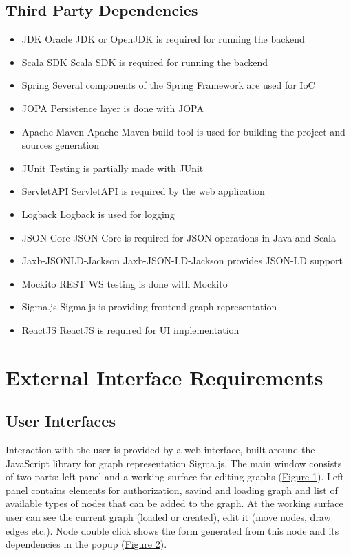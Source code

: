 \documentclass{article}
\begin{document}
\subsection{Third Party Dependencies}
\begin{itemize}
    \item JDK
	Oracle JDK or OpenJDK is required for running the backend
    \item Scala SDK
	Scala SDK is required for running the backend
    \item Spring
	Several components of the Spring Framework are used for IoC
    \item JOPA
	Persistence layer is done with JOPA
    \item Apache Maven
	Apache Maven build tool is used for building the project and sources generation
    \item JUnit
	Testing is partially made with JUnit
    \item ServletAPI
	ServletAPI is required by the web application 
    \item Logback
	Logback is used for logging
    \item JSON-Core
	JSON-Core is required for JSON operations in Java and Scala
    \item Jaxb-JSONLD-Jackson
	Jaxb-JSON-LD-Jackson provides JSON-LD support
    \item Mockito
	REST WS testing is done with Mockito
    \item Sigma.js
	Sigma.js is providing frontend graph representation
    \item ReactJS
	ReactJS is required for UI implementation
\end{itemize}
\section{External Interface Requirements}
\subsection{User Interfaces}
Interaction with the user is provided by a web-interface, built around the JavaScript library for graph representation Sigma.js. The main window consists of two parts: left panel and a working surface for editing graphs (\hyperref[pic1]{Figure 1}). Left panel contains elements for authorization, savind and loading graph and list of available types of nodes that can be added to the graph. At the working surface user can see the current graph (loaded or created), edit it (move nodes, draw edges etc.). Node double click shows the form generated from this node and its dependencies in the popup (\hyperref[pic1]{Figure 2}).
\end{document}

